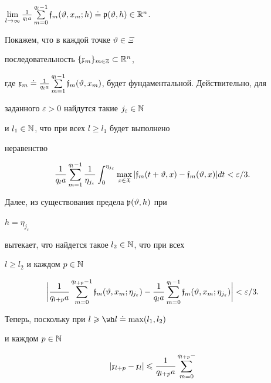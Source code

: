 \begin{pf}
$\lim\limits_{l\to\infty}\frac{1}{q_la}\sum\limits_{m=0}^{q_l-1}


\frak f_m(\vartheta,x_m;h)\doteq


\frak p(\vartheta,h)\in\Bbb R^n$.


Покажем, что в каждой точке $\vartheta\in\Xi$


последовательность $\{\frak x_m\}_{m\in\Bbb Z}\subset\Bbb R^n$,


где $\frak x_m\doteq\frac{1}{q_la}\sum\limits_{m=1}^{q_l-1}\frak


f_m(\vartheta,x_m)$, будет фундаментальной. Действительно, для


заданного $\varepsilon>0$ найдутся такие $j_\varepsilon\in\Bbb N$


и $l_1\in\Bbb N$, что при всех $l\geqslant l_1$ будет выполнено


неравенство


$$


\frac{1}{q_la}\sum_{m=1}^{q_l-1}


\frac{1}{\eta_{j_\varepsilon}}\int_0^{\eta_{j_\varepsilon}}


\max_{x\in\frak X}|\frak f_m(t+\vartheta,x)-\frak


f_m(\vartheta,x)|dt<\varepsilon/3.


$$





Далее, из существования предела $\frak p(\vartheta,h)$ при


$h=\eta_{j_\varepsilon}$


вытекает, что найдется такое $l_2\in{\Bbb N}$, что при всех


$l\geqslant l_2$ и каждом $p\in\Bbb N$


$$


\bigg|\frac{1}{q_{l+p}a}\sum_{m=0}^{q_{l+p}-1}


\frak f_m(\vartheta,x_m;\eta_{j_\varepsilon})-


\frac{1}{q_la}\sum_{m=0}^{q_l-1}\frak


f_m(\vartheta,x_m;\eta_{j_\varepsilon})\bigg|<\varepsilon/3.


$$


Теперь, поскольку при $l\geqslant\wh l\doteq \max (l_1, l_2)$


и каждом $p\in{\Bbb N}$


\begin{gather*}


|\frak x_{l+p}-\frak x_l|\leqslant


\frac{1}{q_{l+p}a}\sum\limits_{m=0}^{q_{l+p}-


}
\end{gather*}
\end{pf}
